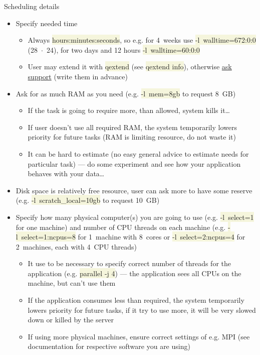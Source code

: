 \documentclass[compress, xelatex, 11pt, xcolor=svgnames, aspectratio=169,
	hyperref={
		bookmarks=true,
		unicode=true,
		colorlinks=true,
		pdftitle={Linux, command line and MetaCentrum},
		plainpages=false,
		pdfauthor={Vojtech Zeisek},
		pdfsubject={Course about use of Linux command line, writing shell scripts and using MetaCentrum of CESNET},
		pdfcreator={XeLaTeX},
		pdfkeywords={Linux, GNU, BASH, shell, command line, MetaCentrum},
		linkcolor=DarkRed, %
		anchorcolor=DarkBlue, %
		citecolor=Indigo, %
		filecolor=NavyBlue, %
		menucolor=DarkMagenta, %
		urlcolor=DarkBlue, %
		},
	url={hyphens, lowtilde} %
	]{beamer}
\renewcommand{\texttt}[1]{\colorbox{Beige}{{\ttfamily #1}}}
\begin{document}
\begin{frame}[allowframebreaks]{Scheduling details}
	\begin{itemize}
		\item Specify needed time
		\begin{itemize}
			\item Always \texttt{hours:minutes:seconds}, so e.g. for 4~weeks use \texttt{-l~walltime=672:0:0} (28~$\cdot$~24), for two days and 12 hours \texttt{-l~walltime=60:0:0}
			\item User may extend it with \texttt{qextend} (see \texttt{qextend info}), otherwise \href{mailto:meta@cesnet.cz}{ask support} (write them in advance)
		\end{itemize}
		\item Ask for as much RAM as you need (e.g. \texttt{-l~mem=8gb} to request 8~GB)
		\begin{itemize}
			\item If the task is going to require more, than allowed, system kills it\ldots
			\item If user doesn't use all required RAM, the system temporarily lowers priority for future tasks (RAM is limiting resource, do not waste it)
			\item It can be hard to estimate (no easy general advice to estimate needs for particular task) --- do some experiment and see how your application behaves with your data\ldots
		\end{itemize}
		\item Disk space is relatively free resource, user can ask more to have some reserve (e.g. \texttt{-l~scratch\_local=10gb} to request 10~GB)
		\item Specify how many physical computer(s) you are going to use (e.g. \texttt{-l~select=1} for one machine) and number of CPU threads on each machine (e.g. \texttt{-l~select=1:ncpus=8} for 1~machine with 8~cores or \texttt{-l~select=2:ncpus=4} for 2~machines, each with 4~CPU threads)
		\begin{itemize}
			\item It use to be necessary to specify correct number of threads for the application (e.g. \texttt{parallel -j 4}) --- the application sees all CPUs on the machine, but can't use them
			\item If the application consumes less than required, the system temporarily lowers priority for future tasks, if it try to use more, it will be very slowed down or killed by the server
			\item If using more physical machines, ensure correct settings of e.g. MPI (see documentation for respective software you are using)

\end{itemize}
\end{itemize}
\end{frame}
\end{document}
